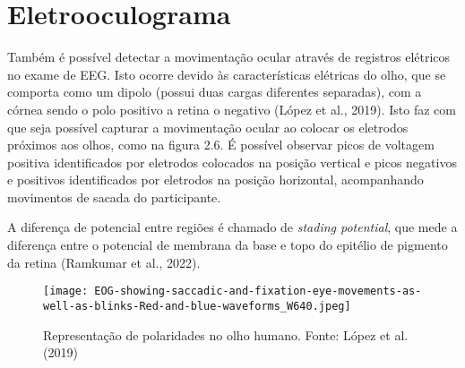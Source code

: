   \section{Eletrooculograma} 


Também é possível detectar a movimentação ocular através de registros elétricos
no exame de EEG. Isto ocorre devido às características elétricas do olho, que se
comporta como um dipolo (possui duas cargas diferentes separadas), com a córnea
sendo o polo positivo a retina o negativo (López et al., 2019). Isto faz com que seja possível capturar a
movimentação ocular ao colocar os eletrodos próximos aos olhos, como na figura 2.6.
É possível observar picos de voltagem positiva identificados por eletrodos colocados
na posição vertical e picos negativos e positivos identificados por eletrodos na posição
horizontal, acompanhando movimentos de sacada do participante.

A diferença de potencial entre regiões é chamado de \textit{stading potential}, que mede a diferença entre o potencial de membrana da base e topo 
do epitélio de pigmento da retina (Ramkumar et al., 2022).



\begin{figure}[h]
  \centering
  \texttt{[image: EOG-showing-saccadic-and-fixation-eye-movements-as-well-as-blinks-Red-and-blue-waveforms\_W640.jpeg]}
  \caption[]{Representação de polaridades no olho humano. Fonte:  López et al. (2019)}\label{fig:}
  \end{figure}

  
  
  
